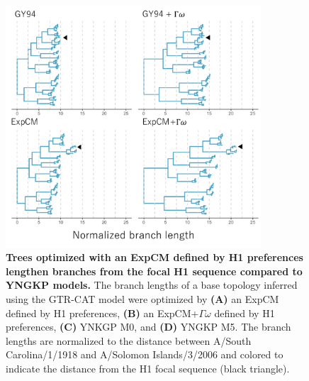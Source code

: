 \documentclass[11pt]{article}
\begin{document}
\begin{figure}
\centerline{\includegraphics[width=0.85\textwidth]{figures/tree_doud}}
\caption{\label{fig:tree_doud}
\textbf{Trees optimized with an ExpCM defined by H1 preferences lengthen branches from the focal H1 sequence compared to YNGKP models.} 
The branch lengths of a base topology inferred using the GTR-CAT model were optimized by \textbf{(A)} an ExpCM defined by H1 preferences, \textbf{(B)} an ExpCM+$\Gamma\omega$ defined by H1 preferences, \textbf{(C)} YNKGP M0, and \textbf{(D)} YNGKP M5.
The branch lengths are normalized to the distance between A/South Carolina/1/1918 and A/Solomon Islands/3/2006 and colored to indicate the distance from the H1 focal sequence (black triangle).
}
\end{figure}
\end{document}
